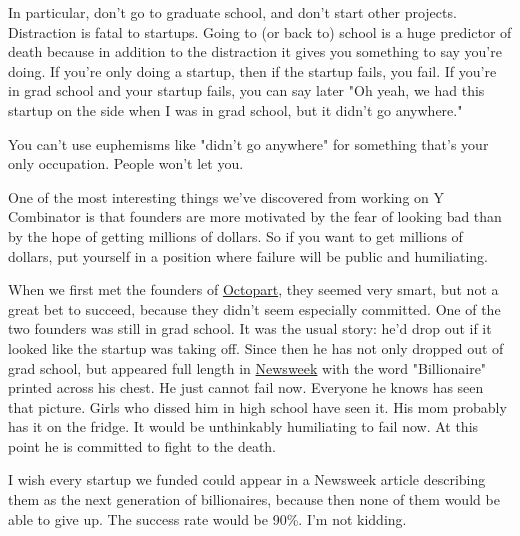 In particular,
                    don't go to graduate school, and don't start other projects.
                    Distraction is fatal to startups. Going to (or back to)
                    school is a huge predictor of death because in addition to
                    the distraction it gives you something to say you're doing.
                    If you're only doing a startup, then if the startup fails,
                    you fail. If you're in grad school and your startup fails,
                    you can say later "Oh yeah, we had this startup on the side
                    when I was in grad school, but it didn't go anywhere."

You
                    can't use euphemisms like "didn't go anywhere" for something
                    that's your only occupation. People won't let you.

One
                    of the most interesting things we've discovered from working
                    on Y Combinator is that founders are more motivated by the
                    fear of looking bad than by the hope of getting millions of
                    dollars. So if you want to get millions of dollars, put
                    yourself in a position where failure will be public and
                    humiliating.

When we first met the founders of
                    \href{http://octopart.com}{Octopart}, they seemed very
                    smart, but not a great bet to succeed, because they didn't
                    seem especially committed. One of the two founders was still
                    in grad school. It was the usual story: he'd drop out if it
                    looked like the startup was taking off. Since then he has
                    not only dropped out of grad school, but appeared full
                    length in
                    \href{http://docs.octopart.com/newsweek\_octopart\_small.jpg}{Newsweek}
                    with the word "Billionaire" printed across his chest. He
                    just cannot fail now. Everyone he knows has seen that
                    picture. Girls who dissed him in high school have seen it.
                    His mom probably has it on the fridge. It would be
                    unthinkably humiliating to fail now. At this point he is
                    committed to fight to the death.

I wish every
                    startup we funded could appear in a Newsweek article
                    describing them as the next generation of billionaires,
                    because then none of them would be able to give up. The
                    success rate would be 90\%. I'm not kidding.

